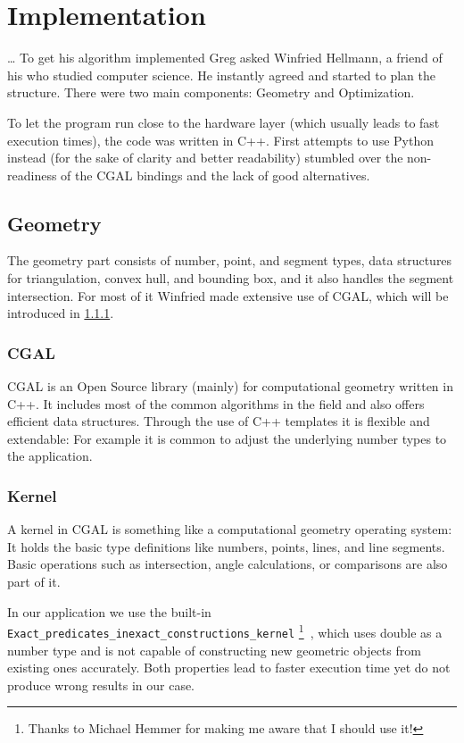 \chapter{Implementation}
\label{cha:implementation}
\ldots{}
To get his algorithm implemented Greg asked Winfried Hellmann, a
friend of his who studied computer science. He instantly agreed and
started to plan the structure. There were two main components:
Geometry and Optimization.

To let the program run close to the hardware layer (which usually
leads to fast execution times), the code was written in C++. First
attempts to use Python instead (for the sake of clarity and better
readability) stumbled over the non-readiness of the CGAL bindings and
the lack of good alternatives.

\section{Geometry}
The geometry part consists of number, point, and segment types, 
data structures for triangulation, convex hull, and bounding box, 
and it also handles the segment intersection. For most of it Winfried 
made extensive use of CGAL, which will be introduced in \cref{sec:CGAL}.

\subsection{CGAL}
\label{sec:CGAL}
CGAL \cite{cgal} is an Open Source library (mainly) for computational
geometry written in C++. It includes most of the common algorithms in
the field and also offers efficient data structures. Through the use
of C++ templates it is flexible and extendable: For example it is
common to adjust the underlying number types to the application.

\subsection{Kernel}
A kernel in CGAL is something like a computational geometry operating
system: It holds the basic type definitions like numbers, points,
lines, and line segments. Basic operations such as intersection,
angle calculations, or comparisons are also part of it.

In our application we use the built-in 
\verb|Exact_predicates_inexact_constructions_kernel|%
\footnote{Thanks to Michael Hemmer for making me aware that I should
use it!}~\cite{cgal_manual_epick}, which uses double as a number type
and is not capable of constructing new geometric objects from existing
ones accurately. Both properties lead to faster execution time yet do 
not produce wrong results in our case.

